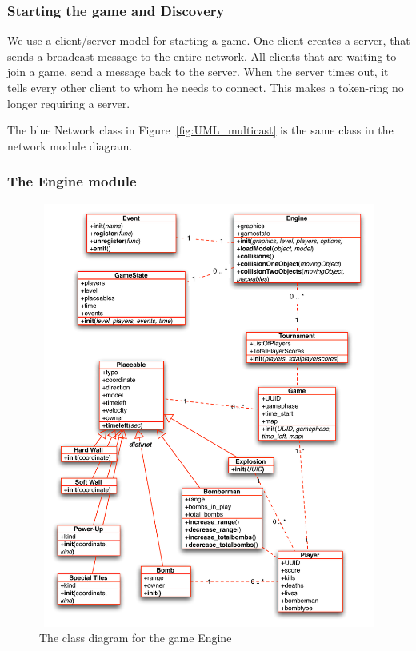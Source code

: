             \subsubsection{Starting the game and Discovery} %
            \label{ssub:starting_the_game_and_discovery}
                We use a client/server model for starting a game. One client creates a server, that sends a broadcast message to the entire network. All clients that are waiting to join a game, send a message back to the server. When the server times out, it tells every other client to whom he needs to connect. This makes a token-ring no longer requiring a server.

           The blue Network class in Figure~\ref{fig:UML_multicast} is the same class in the network module diagram.


        \subsubsection{The Engine module} %
        \label{ssub:the_engine_module}

          \begin{figure}[!ht]
            \centering
            \includegraphics[width=12cm,height=14cm]{diagrams/UML_engine}
            \caption{The class diagram for the game Engine} \label{fig:UML_engine}
          \end{figure}

